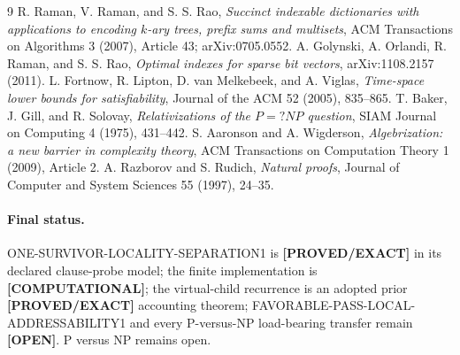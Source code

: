 \documentclass[11pt]{article}
\newcommand{\status}[1]{\textbf{[#1]}}
\begin{document}
\begin{thebibliography}{9}
R. Raman, V. Raman, and S. S. Rao,
\emph{Succinct indexable dictionaries with applications to encoding
$k$-ary trees, prefix sums and multisets}, ACM Transactions on Algorithms 3
(2007), Article 43; arXiv:0705.0552.
A. Golynski, A. Orlandi, R. Raman, and S. S. Rao,
\emph{Optimal indexes for sparse bit vectors}, arXiv:1108.2157 (2011).
L. Fortnow, R. Lipton, D. van Melkebeek, and A. Viglas,
\emph{Time-space lower bounds for satisfiability}, Journal of the ACM 52
(2005), 835--865.
T. Baker, J. Gill, and R. Solovay,
\emph{Relativizations of the $P=?NP$ question}, SIAM Journal on Computing 4
(1975), 431--442.
S. Aaronson and A. Wigderson,
\emph{Algebrization: a new barrier in complexity theory}, ACM Transactions
on Computation Theory 1 (2009), Article 2.
A. Razborov and S. Rudich,
\emph{Natural proofs}, Journal of Computer and System Sciences 55 (1997),
24--35.
\end{thebibliography}

\paragraph{Final status.}
ONE-SURVIVOR-LOCALITY-SEPARATION1 is \status{PROVED/EXACT} in its declared
clause-probe model; the finite implementation is \status{COMPUTATIONAL}; the
virtual-child recurrence is an adopted prior \status{PROVED/EXACT}
accounting theorem; FAVORABLE-PASS-LOCAL-ADDRESSABILITY1 and every
P-versus-NP load-bearing transfer remain \status{OPEN}.  P versus NP remains
open.

\end{document}
